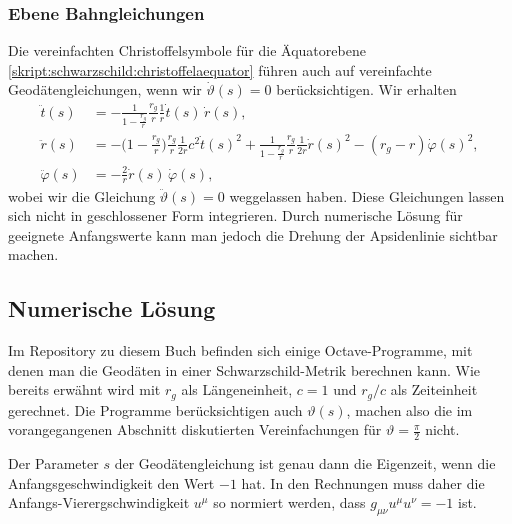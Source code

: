 \subsubsection{Ebene Bahngleichungen}
Die vereinfachten Christoffelsymbole für die Äquatorebene
\eqref{skript:schwarzschild:christoffelaequator}
führen auch auf vereinfachte Geodätengleichungen, wenn wir $\dot\vartheta(s)=0$
berücksichtigen.
Wir erhalten
\begin{align*}
\ddot t(s)
&=
-\frac{1}{1-\displaystyle\frac{r_g}{r}}\frac{r_g}{r}\frac{1}{r}\dot t(s)\,\dot r(s),
\\
\ddot r(s)
&=
-\biggl(1-\frac{r_g}{r}\biggr)\frac{r_g}{r}\frac1{2r}c^2\dot t(s)^2
+\frac{1}{1-\displaystyle\frac{r_g}{r}} \frac{r_g}{r}\frac1{2r}\dot r(s)^2
- (r_g-r) \dot\varphi(s)^2,
\\
\ddot \varphi(s)
&=
-\frac2r \dot r(s)\,\dot\varphi(s),
\end{align*}
wobei wir die Gleichung $\ddot\vartheta(s) = 0$ weggelassen haben.
Diese Gleichungen lassen sich nicht in geschlossener Form integrieren.
Durch numerische Lösung für geeignete Anfangswerte kann man jedoch die
Drehung der Apsidenlinie sichtbar machen.

\subsection{Numerische Lösung}
Im Repository zu diesem Buch befinden sich einige Octave-Programme,
mit denen man die Geodäten in einer Schwarzschild-Metrik berechnen kann.
Wie bereits erwähnt wird mit $r_g$ als Längeneinheit, $c=1$ und $r_g/c$
als Zeiteinheit gerechnet.
Die Programme berücksichtigen auch $\vartheta(s)$, machen also die 
im vorangegangenen Abschnitt diskutierten Vereinfachungen für
$\vartheta=\frac{\pi}2$ nicht.

Der Parameter $s$ der Geodätengleichung ist genau dann die Eigenzeit,
wenn die Anfangsgeschwindigkeit den Wert $-1$ hat.
In den Rechnungen muss daher die Anfangs-Vierergschwindigkeit $u^\mu$
so normiert werden, dass $g_{\mu\nu}u^\mu u^\nu=-1$ ist.

